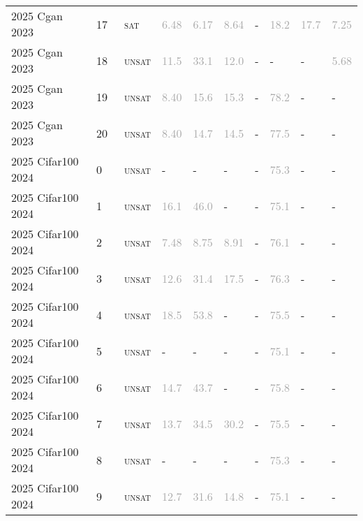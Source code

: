 \begin{center}
{\begin{longtable}{@{}llllllllll@{}}
2025 Cgan 2023 & 17 & ~\textsc{sat} & \textcolor{darkgray}{6.48} & \textcolor{darkgray}{6.17} & \textcolor{darkgray}{8.64} & - & \textcolor{darkgray}{18.2} & \textcolor{darkgray}{17.7} & \textcolor{darkgray}{7.25} \\
2025 Cgan 2023 & 18 & ~\textsc{unsat} & \textcolor{darkgray}{11.5} & \textcolor{darkgray}{33.1} & \textcolor{darkgray}{12.0} & - & - & - & \textcolor{darkgray}{5.68} \\
2025 Cgan 2023 & 19 & ~\textsc{unsat} & \textcolor{darkgray}{8.40} & \textcolor{darkgray}{15.6} & \textcolor{darkgray}{15.3} & - & \textcolor{darkgray}{78.2} & - & - \\
2025 Cgan 2023 & 20 & ~\textsc{unsat} & \textcolor{darkgray}{8.40} & \textcolor{darkgray}{14.7} & \textcolor{darkgray}{14.5} & - & \textcolor{darkgray}{77.5} & - & - \\
\midrule
2025 Cifar100 2024 & 0 & ~\textsc{unsat} & - & - & - & - & \textcolor{darkgray}{75.3} & - & - \\
2025 Cifar100 2024 & 1 & ~\textsc{unsat} & \textcolor{darkgray}{16.1} & \textcolor{darkgray}{46.0} & - & - & \textcolor{darkgray}{75.1} & - & - \\
2025 Cifar100 2024 & 2 & ~\textsc{unsat} & \textcolor{darkgray}{7.48} & \textcolor{darkgray}{8.75} & \textcolor{darkgray}{8.91} & - & \textcolor{darkgray}{76.1} & - & - \\
2025 Cifar100 2024 & 3 & ~\textsc{unsat} & \textcolor{darkgray}{12.6} & \textcolor{darkgray}{31.4} & \textcolor{darkgray}{17.5} & - & \textcolor{darkgray}{76.3} & - & - \\
2025 Cifar100 2024 & 4 & ~\textsc{unsat} & \textcolor{darkgray}{18.5} & \textcolor{darkgray}{53.8} & - & - & \textcolor{darkgray}{75.5} & - & - \\
2025 Cifar100 2024 & 5 & ~\textsc{unsat} & - & - & - & - & \textcolor{darkgray}{75.1} & - & - \\
2025 Cifar100 2024 & 6 & ~\textsc{unsat} & \textcolor{darkgray}{14.7} & \textcolor{darkgray}{43.7} & - & - & \textcolor{darkgray}{75.8} & - & - \\
2025 Cifar100 2024 & 7 & ~\textsc{unsat} & \textcolor{darkgray}{13.7} & \textcolor{darkgray}{34.5} & \textcolor{darkgray}{30.2} & - & \textcolor{darkgray}{75.5} & - & - \\
2025 Cifar100 2024 & 8 & ~\textsc{unsat} & - & - & - & - & \textcolor{darkgray}{75.3} & - & - \\
2025 Cifar100 2024 & 9 & ~\textsc{unsat} & \textcolor{darkgray}{12.7} & \textcolor{darkgray}{31.6} & \textcolor{darkgray}{14.8} & - & \textcolor{darkgray}{75.1} & - & - \\

\end{longtable}}
\end{center}
